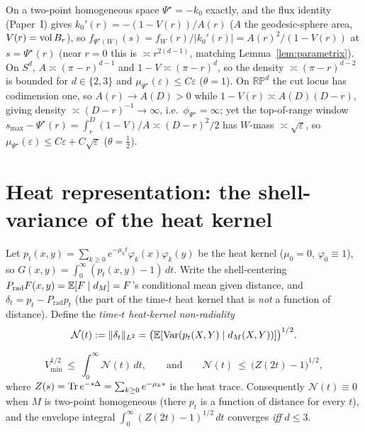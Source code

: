 \begin{lemma}\label{lem:anchormod}
On a two-point homogeneous space $\Psi^\star=-k_0$ exactly, and the flux identity (Paper~I)
gives $k_0'(r)=-(1-V(r))/A(r)$ ($A$ the geodesic-sphere area, $V(r)=\operatorname{vol} B_r$), so
$f_{\Psi^\star(W)}(s)=f_W(r)/\lvert k_0'(r)\rvert=A(r)^2/(1-V(r))$ at $s=\Psi^\star(r)$ (near
$r=0$ this is $\asymp r^{2(d-1)}$, matching Lemma~\ref{lem:parametrix}). On $S^d$,
$A\asymp(\pi-r)^{d-1}$ and $1-V\asymp(\pi-r)^d$, so the density $\asymp(\pi-r)^{d-2}$ is bounded
for $d\in\{2,3\}$ and $\mu_{\Psi^\star}(\varepsilon)\le C\varepsilon$ ($\theta=1$). On
$\mathbb{RP}^d$ the cut locus has codimension one, so $A(r)\to A(D)>0$ while
$1-V(r)\asymp A(D)(D-r)$, giving density $\asymp(D-r)^{-1}\to\infty$, i.e.\
$\phi_{\Psi^\star}=\infty$; yet the top-of-range window
$s_{\max}-\Psi^\star(r)=\int_r^D(1-V)/A\asymp(D-r)^2/2$ has $W$-mass $\asymp\sqrt\varepsilon$, so
$\mu_{\Psi^\star}(\varepsilon)\le C\varepsilon+C\sqrt\varepsilon$ ($\theta=\tfrac12$).
\end{lemma}

\section{Heat representation: the shell-variance of the heat kernel}

Let $p_t(x,y)=\sum_{k\ge0}e^{-\mu_k t}\varphi_k(x)\varphi_k(y)$ be the heat kernel
($\mu_0=0$, $\varphi_0\equiv1$), so $G(x,y)=\int_0^\infty(p_t(x,y)-1)\,dt$. Write the
shell-centering $P_{\mathrm{rad}}F(x,y)=\mathbb E[F\mid d_M]=F$'s conditional mean given distance,
and $\delta_t=p_t-P_{\mathrm{rad}}p_t$ (the part of the time-$t$ heat kernel that is
\emph{not} a function of distance). Define the \emph{time-$t$ heat-kernel non-radiality}
\[
\mathcal N(t):=\lVert\delta_t\rVert_{L^2}=\bigl(\mathbb E[\operatorname{Var}(p_t(X,Y)\mid d_M(X,Y))]\bigr)^{1/2}.
\]

\begin{lemma}\label{lem:reduce}
\[
V_{\min}^{1/2}\ \le\ \int_0^\infty\mathcal N(t)\,dt,
\qquad\text{and}\qquad
\mathcal N(t)\ \le\ \bigl(Z(2t)-1\bigr)^{1/2},
\]
where $Z(s)=\operatorname{Tr} e^{-s\Delta}=\sum_{k\ge0}e^{-\mu_k s}$ is the heat trace. Consequently
$\mathcal N(t)\equiv0$ when $M$ is two-point homogeneous (there $p_t$ is a function of
distance for every $t$), and the envelope integral $\int_0^\infty(Z(2t)-1)^{1/2}\,dt$
converges \emph{iff} $d\le3$.
\end{lemma}

